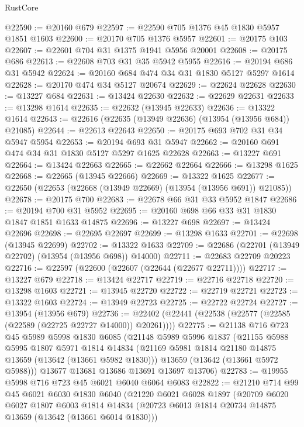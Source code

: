 \begin{lexlean}{RustCore}
\begin{coremodule}
@22590 := @20160 @679
@22597 := @22590 @705 @1376 @45 @1830 @5957 @1851 @1603
@22600 := @20170 @705 @1376 @5957
@22601 := @20175 @103
@22607 := @22601 @704 @31 @1375 @1941 @5956 @20001
@22608 := @20175 @686
@22613 := @22608 @703 @31 @35 @5942 @5955
@22616 := @20194 @686 @31 @5942
@22624 := @20160 @684 @474 @34 @31 @1830 @5127 @5297 @1614
@22628 := @20170 @474 @34 @5127 @20674
@22629 := @22624 @22628
@22630 := @13227 @684
@22631 := @13424 @22630
@22632 := @22629 @22631
@22633 := @13298 @1614
@22635 := @22632 (@13945 @22633)
@22636 := @13322 @1614
@22643 := @22616 (@22635 (@13949 @22636) (@13954 (@13956 @684)) @21085)
@22644 := @22613 @22643
@22650 := @20175 @693 @702 @31 @34 @5947 @5954
@22653 := @20194 @693 @31 @5947
@22662 := @20160 @691 @474 @34 @31 @1830 @5127 @5297 @1625 @22628
@22663 := @13227 @691
@22664 := @13424 @22663
@22665 := @22662 @22664
@22666 := @13298 @1625
@22668 := @22665 (@13945 @22666)
@22669 := @13322 @1625
@22677 := @22650 (@22653 (@22668 (@13949 @22669) (@13954 (@13956 @691)) @21085))
@22678 := @20175 @700
@22683 := @22678 @66 @31 @33 @5952 @1847
@22686 := @20194 @700 @31 @5952
@22695 := @20160 @698 @66 @33 @31 @1830 @1847 @1851 @1633 @14875
@22696 := @13227 @698
@22697 := @13424 @22696
@22698 := @22695 @22697
@22699 := @13298 @1633
@22701 := @22698 (@13945 @22699)
@22702 := @13322 @1633
@22709 := @22686 (@22701 (@13949 @22702) (@13954 (@13956 @698)) @14000)
@22711 := @22683 @22709 @20223
@22716 := @22597 (@22600 (@22607 (@22644 (@22677 @22711))))
@22717 := @13227 @679
@22718 := @13424 @22717
@22719 := @22716 @22718
@22720 := @13298 @1603
@22721 := @13945 @22720
@22722 := @22719 @22721
@22723 := @13322 @1603
@22724 := @13949 @22723
@22725 := @22722 @22724
@22727 := @13954 (@13956 @679)
@22736 := @22402 (@22441 (@22538 (@22577 (@22585 (@22589 (@22725 @22727 @14000)) @20261))))
@22775 := @21138
    @716
    @723
    @45
    @5989
    @5998
    @1830
    @6085
    (@21148
      @5989
      @5996
      @1837
      (@21155
        @5988
        @5995
        @1807
        @5971
        @1814
        @14834
        (@21169 @5981 @1814 @21180 @14875 @13659 (@13642 (@13661 @5982 @1830)))
        @13659
        (@13642 (@13661 @5972 @5988)))
      @13677
      @13681
      @13686
      @13691
      @13697
      @13706)
@22783 := @19955 @5998 @716 @723 @45 @6021 @6040 @6064 @6083
@22822 := @21210
    @714
    @99
    @45
    @6021
    @6030
    @1830
    @6040
    (@21220
      @6021
      @6028
      @1897
      (@20709
        @6020
        @6027
        @1807
        @6003
        @1814
        @14834
        (@20723 @6013 @1814 @20734 @14875 @13659 (@13642 (@13661 @6014 @1830)))

\end{coremodule}
\end{lexlean}
